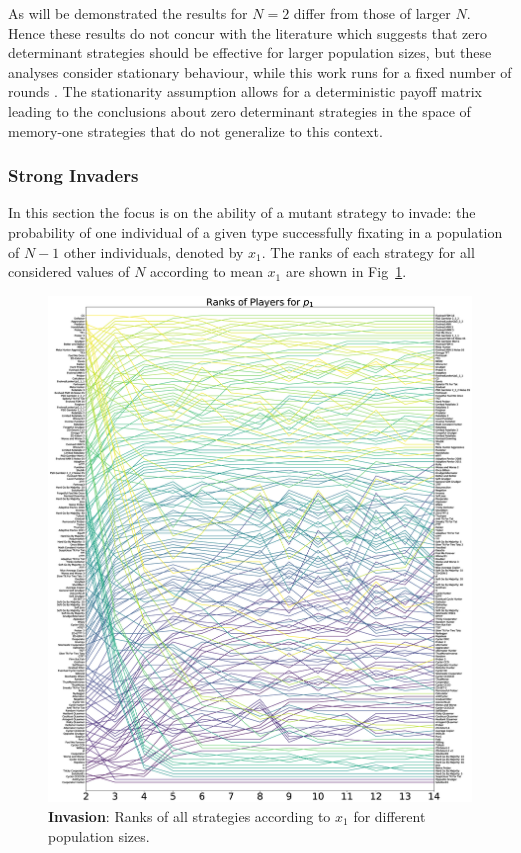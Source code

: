 \documentclass[10pt,letterpaper]{article}
\begin{document}
As will be demonstrated the results for
\(N=2\) differ from those of larger $N$. Hence these results do not concur with
the literature which suggests that zero determinant strategies should be
effective for larger population sizes, but these analyses consider stationary
behaviour, while this work runs for a fixed number of rounds \cite{stewart2013extortion}.
The stationarity assumption allows for a deterministic payoff matrix
leading to the conclusions about zero determinant strategies in the space
of memory-one strategies that do not generalize to this context.

\subsubsection*{Strong Invaders}

In this section the focus is on the ability of a mutant strategy to invade: the
probability of one individual of a given type successfully fixating in a
population of \(N - 1\) other individuals, denoted by \(x_1\). The ranks of each
strategy for all considered values of \(N\) according to mean \(x_1\) are shown
in Fig~\ref{fig:ranks_v_size_invade}.

\begin{figure}[!hbtp]
    \centering
    \includegraphics[draft, width=\columnwidth]{./Fig3.eps}
    \caption{\textbf{Invasion}: Ranks of all strategies according to \(x_1\) for different population sizes.}
    \label{fig:ranks_v_size_invade}
\end{figure}
\end{document}
